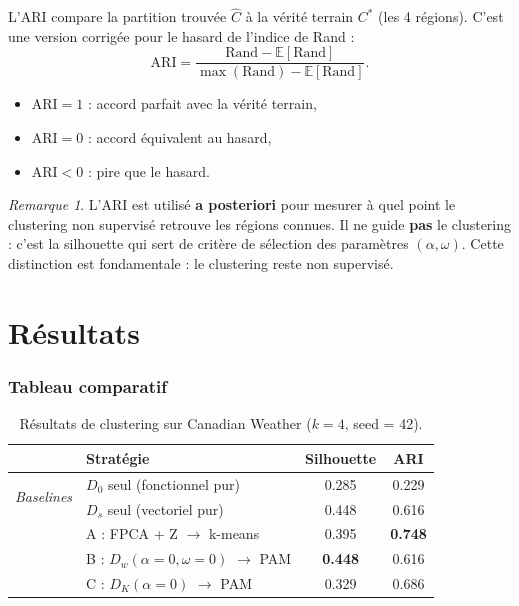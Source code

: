 \documentclass[11pt, a4paper]{article}
\newcommand{\E}{\mathbb{E}}
\newcommand{\Dw}{D_w}
\newcommand{\DK}{D_K}
\theoremstyle{definition}
\theoremstyle{remark}
\newtheorem{remarque}{Remarque}[section]
\begin{document}
L'ARI compare la partition trouvée $\hat{C}$ à la vérité terrain $C^*$
(les 4 régions). C'est une version corrigée pour le hasard de l'indice de Rand :
\[
  \text{ARI} = \frac{\text{Rand} - \E[\text{Rand}]}{\max(\text{Rand}) - \E[\text{Rand}]}.
\]
\begin{itemize}[nosep]
  \item $\text{ARI} = 1$ : accord parfait avec la vérité terrain,
  \item $\text{ARI} = 0$ : accord équivalent au hasard,
  \item $\text{ARI} < 0$ : pire que le hasard.
\end{itemize}

\begin{remarque}
L'ARI est utilisé \textbf{a posteriori} pour mesurer à quel point le clustering
non supervisé retrouve les régions connues. Il ne guide \textbf{pas} le
clustering : c'est la silhouette qui sert de critère de sélection des
paramètres $(\alpha, \omega)$. Cette distinction est fondamentale : le
clustering reste non supervisé.
\end{remarque}

\newpage
\part{Résultats}

\section{Tableau comparatif}

\begin{table}[H]
\centering
\begin{tabular}{llcc}
  \toprule
  & \textbf{Stratégie} & \textbf{Silhouette} & \textbf{ARI} \\
  \midrule
  \multirow{2}{*}{\textit{Baselines}}
  & $D_0$ seul (fonctionnel pur)  & 0.285 & 0.229 \\
  & $D_s$ seul (vectoriel pur)    & 0.448 & 0.616 \\
  \midrule
  & A : FPCA + Z $\to$ k-means   & 0.395 & \textbf{0.748} \\
  & B : $\Dw(\alpha\!=\!0, \omega\!=\!0)$ $\to$ PAM & \textbf{0.448} & 0.616 \\
  & C : $\DK(\alpha\!=\!0)$ $\to$ PAM & 0.329 & 0.686 \\
  \bottomrule
\end{tabular}
\caption{Résultats de clustering sur Canadian Weather ($k = 4$, seed = 42).}
\label{tab:resultats}
\end{table}
\end{document}
